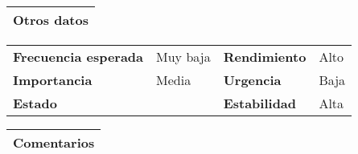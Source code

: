 \documentclass[11pt,a4paper]{article}
\begin{document}
\begin{table}[H]
	\begin{tabularx}{\textwidth}{X}
		\textbf{Otros datos}\\ \hline
	\end{tabularx}
	\begin{tabularx}{\textwidth}{lXlX}
		\textbf{Frecuencia esperada} & Muy baja & \textbf{Rendimiento} & Alto\\
		\textbf{Importancia} & Media & \textbf{Urgencia} & Baja\\
		\textbf{Estado} &  & \textbf{Estabilidad} & Alta \\
	\end{tabularx}
	
	\begin{tabularx}{\textwidth}{X}
		\textbf{Comentarios}\\ \hline
	\end{tabularx}
\end{table}

\newpage


\end{document}
